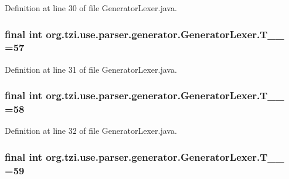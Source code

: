 Definition at line 30 of file Generator\-Lexer.\-java.

\hypertarget{classorg_1_1tzi_1_1use_1_1parser_1_1generator_1_1_generator_lexer_a99e3113ccad1d41fd08a7371b93b11ab}{
\subsubsection[{T\-\_\-\-\_\-57}]{\setlength{\rightskip}{0pt plus 5cm}final int org.\-tzi.\-use.\-parser.\-generator.\-Generator\-Lexer.\-T\-\_\-\-\_ =57\hspace{0.3cm}{\ttfamily [static]}}}\label{classorg_1_1tzi_1_1use_1_1parser_1_1generator_1_1_generator_lexer_a99e3113ccad1d41fd08a7371b93b11ab}


Definition at line 31 of file Generator\-Lexer.\-java.

\hypertarget{classorg_1_1tzi_1_1use_1_1parser_1_1generator_1_1_generator_lexer_a1039725a3ab5d45588429683b3832295}{
\subsubsection[{T\-\_\-\-\_\-58}]{\setlength{\rightskip}{0pt plus 5cm}final int org.\-tzi.\-use.\-parser.\-generator.\-Generator\-Lexer.\-T\-\_\-\-\_ =58\hspace{0.3cm}{\ttfamily [static]}}}\label{classorg_1_1tzi_1_1use_1_1parser_1_1generator_1_1_generator_lexer_a1039725a3ab5d45588429683b3832295}


Definition at line 32 of file Generator\-Lexer.\-java.

\hypertarget{classorg_1_1tzi_1_1use_1_1parser_1_1generator_1_1_generator_lexer_aa884a7dd832766dca67d1db212eed8d7}{
\subsubsection[{T\-\_\-\-\_\-59}]{\setlength{\rightskip}{0pt plus 5cm}final int org.\-tzi.\-use.\-parser.\-generator.\-Generator\-Lexer.\-T\-\_\-\-\_ =59\hspace{0.3cm}{\ttfamily [static]}}}\label{classorg_1_1tzi_1_1use_1_1parser_1_1generator_1_1_generator_lexer_aa884a7dd832766dca67d1db212eed8d7}


